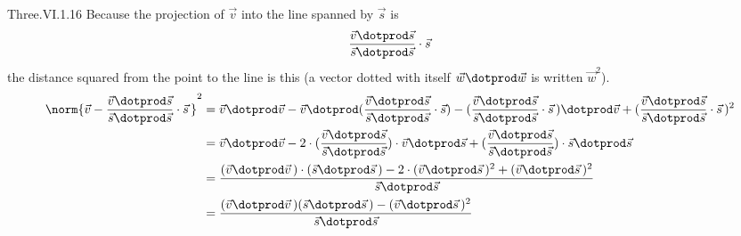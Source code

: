\begin{ans}{Three.VI.1.16}
      Because the projection of \( \vec{v} \) into the line spanned by
      \( \vec{s} \) is
      \begin{equation*}
        \frac{\vec{v}\dotprod\vec{s}}{\vec{s}\dotprod\vec{s}}\cdot\vec{s}
      \end{equation*}
      the distance squared from the point to the line is this
      (a vector dotted with itself $\vec{w}\dotprod\vec{w}$
      is written $\vec{w}^2$).
      \begin{align*}
        \norm{\vec{v}-
                \frac{\vec{v}\dotprod\vec{s}}{\vec{s}\dotprod\vec{s}}
                \cdot\vec{s}\, }^2
        &=\vec{v}\dotprod\vec{v}
        -\vec{v}\dotprod(
              \frac{\vec{v}\dotprod\vec{s}}{\vec{s}\dotprod\vec{s}}\cdot\vec{s}
           )
        -(
              \frac{\vec{v}\dotprod\vec{s}}{\vec{s}\dotprod\vec{s}}
               \cdot\vec{s}\,
         )\dotprod\vec{v}
        +(\frac{\vec{v}\dotprod\vec{s}}{
                \vec{s}\dotprod\vec{s}}\cdot\vec{s}\,)^2     \\
        &=\vec{v}\dotprod\vec{v}
        -2\cdot(\frac{\vec{v}\dotprod\vec{s}}{\vec{s}\dotprod\vec{s}})
           \cdot\vec{v}\dotprod\vec{s}
        +(\frac{\vec{v}\dotprod\vec{s}}{
                \vec{s}\dotprod\vec{s}})\cdot\vec{s}\dotprod\vec{s}  \\
        &=\frac{(\vec{v}\dotprod\vec{v}\,)\cdot(\vec{s}\dotprod\vec{s}\,)
                 -2\cdot(\vec{v}\dotprod\vec{s}\,)^2
                 +(\vec{v}\dotprod\vec{s}\,)^2}{%
               \vec{s}\dotprod\vec{s}}                               \\
        &=\frac{(\vec{v}\dotprod\vec{v}\,)(\vec{s}\dotprod\vec{s}\,)
                -(\vec{v}\dotprod\vec{s}\,)^2}{\vec{s}\dotprod\vec{s}}
      \end{align*}
    
\end{ans}
